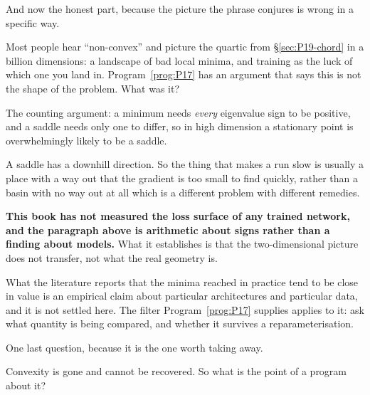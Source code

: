 \begin{fr}
And now the honest part, because the picture the phrase conjures is wrong in a
specific way.

Most people hear \enquote{non-convex} and picture the quartic from
\S\ref{sec:P19-chord} in a billion dimensions: a landscape of bad local
minima, and training as the luck of which one you land in.
Program~\ref{prog:P17} has an argument that says this is not the shape of the
problem. What was it?
\dotline
\nextframe
\end{fr}

\begin{fr}
\begin{ansblock}
The counting argument: a minimum needs \emph{every} eigenvalue sign to be
positive, and a saddle needs only one to differ, so in high dimension a
stationary point is overwhelmingly likely to be a saddle.
\end{ansblock}

A saddle has a downhill direction. So the thing that makes a run slow is
usually a place with a way out that the gradient is too small to find
quickly, rather than a basin with no way out at all \dash{} which is a
different problem with different remedies.

\begin{warning}
\textbf{This book has not measured the loss surface of any trained network,
and the paragraph above is arithmetic about signs rather than a finding about
models.} What it establishes is that the two-dimensional picture does not
transfer, not what the real geometry is.

What the literature reports \dash{} that the minima reached in practice tend
to be close in value \dash{} is an empirical claim about particular
architectures and particular data, and it is not settled here. The filter
Program~\ref{prog:P17} supplies applies to it: ask what quantity is being
compared, and whether it survives a reparameterisation.
\end{warning}
\end{fr}

\begin{fr}
One last question, because it is the one worth taking away.

Convexity is gone and cannot be recovered. So what is the point of a program
about it?
\nextframe
\end{fr}

